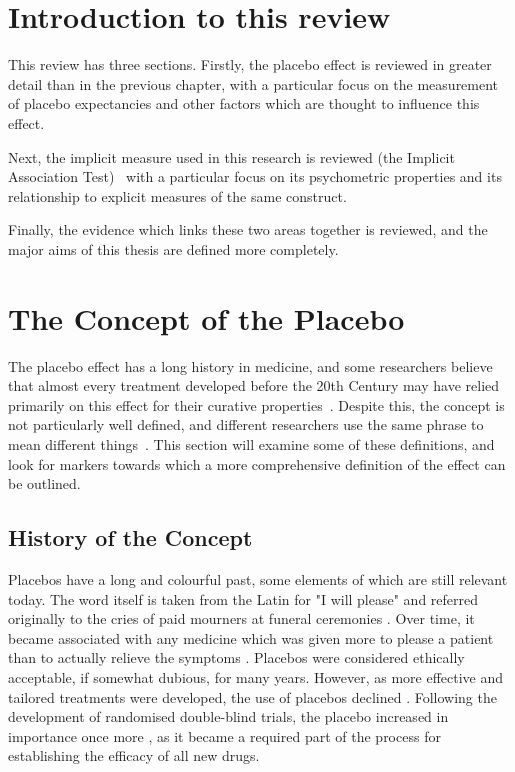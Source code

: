 
\section{Introduction to this review}
\label{sec:intr-this-revi}

This review has three sections.  Firstly, the placebo effect is reviewed in greater detail than in the previous chapter, with a particular focus on the measurement of placebo expectancies and other factors which are thought to influence this effect.

Next, the implicit measure used in this research is reviewed (the Implicit Association Test)~\cite{Greenwald1998} with a particular focus on its psychometric properties and its relationship to explicit measures of the same construct. 

Finally, the evidence which links these two areas together is reviewed, and the major aims of this thesis are defined more completely. 


\section{The Concept of the Placebo}
\label{sec:concept-placebo}

The placebo effect has a long history in medicine, and some researchers believe that almost every treatment developed before the 20th Century may have relied primarily on this effect for their curative properties~\cite{Shapiro1997,Macedo2003}. Despite this, the concept is not particularly well defined, and different researchers use the same phrase to mean different things~\cite{Ernst1995b,hrobjartsson1996uncontrollable}. This section will examine some of these definitions, and look for markers towards which  a more comprehensive definition of the effect can be outlined.  

\subsection{History of the Concept} 
\label{sec:history-concept}

Placebos have a long and colourful past, some elements of which are still relevant today. The word itself is taken from the Latin for "I will please" and referred originally to the cries of paid mourners at funeral ceremonies \cite{Macedo2003}. Over time, it became associated with any medicine which was given more to please a patient than to actually relieve the symptoms \cite{Kaptchuk1998}. Placebos were considered ethically acceptable, if somewhat dubious, for many years. However, as more effective and tailored treatments were developed, the use of placebos declined \cite{Macedo2003}. Following the development of randomised double-blind trials, the  placebo increased in importance once more \cite{Kaptchuk1998}, as it became a required part of the process for establishing the efficacy of all new drugs.  


